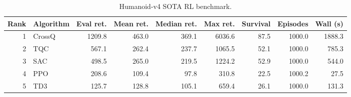 \begin{table}
\caption{Humanoid-v4 SOTA RL benchmark.}
\label{tab:humanoid_main}
\begin{tabular}{rlrrrrrrr}
\toprule
Rank & Algorithm & Eval ret. & Mean ret. & Median ret. & Max ret. & Survival & Episodes & Wall (s) \\
\midrule
1 & CrossQ & 1209.8 & 463.0 & 369.1 & 6036.6 & 87.5 & 1000.0 & 1888.3 \\
2 & TQC & 567.1 & 262.4 & 237.7 & 1065.5 & 52.1 & 1000.0 & 785.3 \\
3 & SAC & 498.5 & 265.0 & 219.5 & 1224.2 & 52.9 & 1000.0 & 544.0 \\
4 & PPO & 208.6 & 109.4 & 97.8 & 310.8 & 22.5 & 1000.2 & 27.5 \\
5 & TD3 & 125.7 & 128.8 & 105.1 & 659.4 & 26.1 & 1000.0 & 131.3 \\
\bottomrule
\end{tabular}
\end{table}
